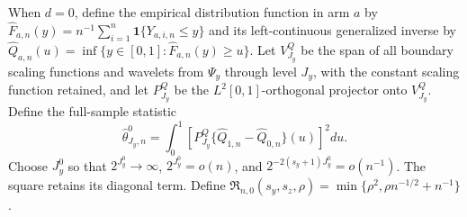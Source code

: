 When \(d=0\), define the empirical distribution function in arm \(a\) by \(\widehat F_{a,n}(y)=n^{-1}\sum_{i=1}^n\mathbf 1\{Y_{a,i,n}\le y\}\) and its left-continuous generalized inverse by \(\widehat Q_{a,n}(u)=\inf\{y\in[0,1]:\widehat F_{a,n}(y)\ge u\}\). Let \(V^Q_{J_y}\) be the span of all boundary scaling functions and wavelets from \(\Psi_y\) through level \(J_y\), with the constant scaling function retained, and let \(P^Q_{J_y}\) be the \(L^2[0,1]\)-orthogonal projector onto \(V^Q_{J_y}\). Define the full-sample statistic
\[
\widehat\theta^0_{J_y,n}=\int_0^1\left[P^Q_{J_y}\{\widehat Q_{1,n}-\widehat Q_{0,n}\}(u)\right]^2du .
\]
Choose \(J_y^0\) so that \(2^{J_y^0}\to\infty\), \(2^{J_y^0}=o(n)\), and \(2^{-2(s_y+1)J_y^0}=o(n^{-1})\). The square retains its diagonal term. Define \(\mathfrak R_{n,0}(s_y,s_z,\rho)=\min\{\rho^2,\rho n^{-1/2}+n^{-1}\}\).